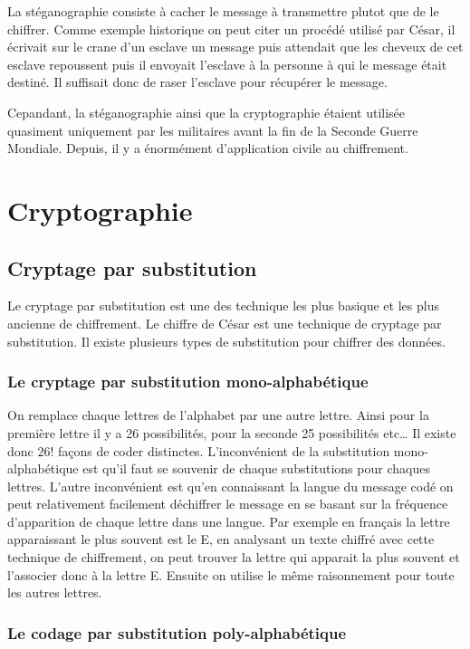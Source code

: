 \documentclass[a4paper,12pt]{article}
\begin{document}
La stéganographie consiste à cacher le message à transmettre plutot que de le chiffrer. Comme exemple historique on peut citer un procédé utilisé par César, il écrivait sur le crane d'un esclave un message puis attendait que les cheveux de cet esclave repoussent puis il envoyait l'esclave à la personne à qui le message était destiné. Il suffisait donc de raser l'esclave pour récupérer le message.

Cepandant, la stéganographie ainsi que la cryptographie étaient utilisée quasiment uniquement par les militaires avant la fin de la Seconde Guerre Mondiale. Depuis, il y a énormément d'application civile au chiffrement.

\section{Cryptographie}

\subsection{Cryptage par substitution}

Le cryptage par substitution  est une des technique les plus basique et les plus ancienne de chiffrement. Le chiffre de César est une technique de cryptage par substitution. Il existe plusieurs types de substitution pour chiffrer des données.

\subsubsection{Le cryptage par substitution mono-alphabétique}

On remplace chaque lettres de l'alphabet par une autre lettre. Ainsi pour la première lettre il y a 26 possibilités, pour la seconde 25 possibilités etc\dots{} Il existe donc $26!$ façons de coder distinctes. L'inconvénient de la substitution mono-alphabétique est qu'il faut se souvenir de chaque substitutions pour chaques lettres. L'autre inconvénient est qu'en connaissant la langue du message codé on peut relativement facilement déchiffrer le message en se basant sur la fréquence d'apparition de chaque lettre dans une langue. Par exemple en français la lettre apparaissant le plus souvent est le E, en analysant un texte chiffré avec cette technique de chiffrement, on peut trouver la lettre qui apparait la plus souvent et l'associer donc à la lettre E. Ensuite on utilise le même raisonnement pour toute les autres lettres.

\subsubsection{Le codage par substitution poly-alphabétique}
\end{document}
